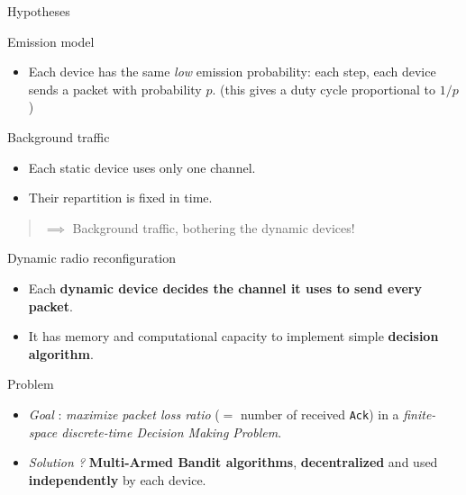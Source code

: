 \documentclass[12pt,english,ignorenonframetext,aspectratio=169,]{beamer}
\providecommand{\tightlist}{%
  \setlength{\itemsep}{0pt}\setlength{\parskip}{0pt}}
\begin{document}
\begin{frame}{Hypotheses}

\begin{block}{Emission model}

\begin{itemize}
\tightlist
\item
  Each device has the same \emph{low} emission probability: \newline
   each step, each device sends a packet with probability \(p\).
  \newline
   \hfill{}\small{(this gives a duty cycle proportional to $1/p$)}
\end{itemize}

\end{block}

\begin{block}{Background traffic}

\begin{itemize}
\tightlist
\item
  Each static device uses only one channel.
\item
  Their repartition is fixed in time.
\end{itemize}

\begin{quote}
\(\implies\) Background traffic, bothering the dynamic devices!
\end{quote}

\end{block}

\begin{block}{Dynamic radio reconfiguration}

\begin{itemize}
\tightlist
\item
  Each \textbf{dynamic device decides the channel it uses to send every
  packet}.
\item
  It has memory and computational capacity to implement simple
  \textbf{decision algorithm}.
\end{itemize}

\end{block}

\begin{block}{Problem}

\begin{itemize}
\tightlist
\item
  \emph{Goal} : \emph{maximize packet loss ratio} (\(=\) number of
  received \texttt{Ack}) in a \emph{finite-space discrete-time Decision
  Making Problem}.
\item
  \emph{Solution ?} \textbf{Multi-Armed Bandit algorithms},
  \textbf{decentralized} and used \textbf{independently} by each device.
\end{itemize}

\end{block}

\end{frame}
\end{document}
